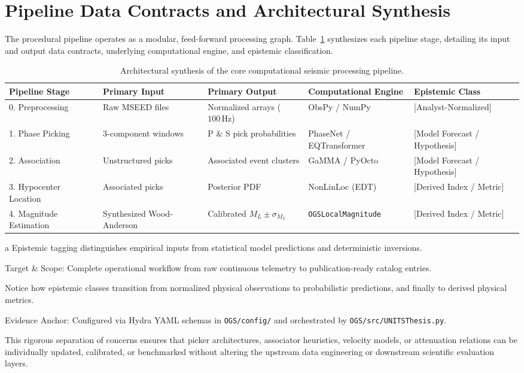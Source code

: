 \section{Pipeline Data Contracts and Architectural Synthesis}
\label{sec:pipeline_synthesis}

The procedural pipeline operates as a modular, feed-forward processing graph. Table~\ref{tab:pipeline_synthesis} synthesizes each pipeline stage, detailing its input and output data contracts, underlying computational engine, and epistemic classification.

\begin{table}[htbp]
  \centering
  \small
  \caption{Architectural synthesis of the core computational seismic processing pipeline.}
  \label{tab:pipeline_synthesis}
  \begin{threeparttable}
    \begin{tabularx}{\linewidth}{l l l l X}
      \toprule
      \textbf{Pipeline Stage} & \textbf{Primary Input} & \textbf{Primary Output} & \textbf{Computational Engine} & \textbf{Epistemic Class\tnote{a}} \\
      \midrule
      0. Preprocessing & Raw MSEED files & Normalized arrays ($100\,\mathrm{Hz}$) & ObsPy / NumPy & [Analyst-Normalized] \\
      1. Phase Picking & 3-component windows & P \& S pick probabilities & PhaseNet / EQTransformer & [Model Forecast / Hypothesis] \\
      2. Association & Unstructured picks & Associated event clusters & GaMMA / PyOcto & [Model Forecast / Hypothesis] \\
      3. Hypocenter Location & Associated picks & Posterior PDF & NonLinLoc (EDT) & [Derived Index / Metric] \\
      4. Magnitude Estimation & Synthesized Wood-Anderson & Calibrated $M_L \pm \sigma_{M_L}$ & \texttt{OGSLocalMagnitude} & [Derived Index / Metric] \\
      \bottomrule
    \end{tabularx}
    \begin{tablenotes}[flushleft]
      \footnotesize
      \item[a] Epistemic tagging distinguishes empirical inputs from statistical model predictions and deterministic inversions.
      \item Target \& Scope: Complete operational workflow from raw continuous telemetry to publication-ready catalog entries.
      \item Notice how epistemic classes transition from normalized physical observations to probabilistic predictions, and finally to derived physical metrics.
      \item Evidence Anchor: Configured via Hydra YAML schemas in \texttt{OGS/config/} and orchestrated by \texttt{OGS/src/UNITSThesis.py}.
    \end{tablenotes}
  \end{threeparttable}
\end{table}

This rigorous separation of concerns ensures that picker architectures, associator heuristics, velocity models, or attenuation relations can be individually updated, calibrated, or benchmarked without altering the upstream data engineering or downstream scientific evaluation layers.
